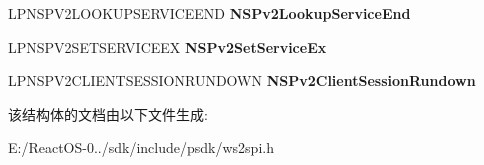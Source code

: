 \begin{DoxyCompactItemize}
\item 
\mbox{\label{struct___n_s_p_v2___r_o_u_t_i_n_e_a05573a2c24877e328718006a6db12b0e}} 
L\+P\+N\+S\+P\+V2\+L\+O\+O\+K\+U\+P\+S\+E\+R\+V\+I\+C\+E\+E\+ND {\bfseries N\+S\+Pv2\+Lookup\+Service\+End}
\item 
\mbox{\label{struct___n_s_p_v2___r_o_u_t_i_n_e_aa176c5df27d88ff22076eac5dbe4bcfe}} 
L\+P\+N\+S\+P\+V2\+S\+E\+T\+S\+E\+R\+V\+I\+C\+E\+EX {\bfseries N\+S\+Pv2\+Set\+Service\+Ex}
\item 
\mbox{\label{struct___n_s_p_v2___r_o_u_t_i_n_e_a7ca7f49b69b5c4cebdb669433ce7624d}} 
L\+P\+N\+S\+P\+V2\+C\+L\+I\+E\+N\+T\+S\+E\+S\+S\+I\+O\+N\+R\+U\+N\+D\+O\+WN {\bfseries N\+S\+Pv2\+Client\+Session\+Rundown}
\end{DoxyCompactItemize}


该结构体的文档由以下文件生成\+:\begin{DoxyCompactItemize}
\item 
E\+:/\+React\+O\+S-\/0../sdk/include/psdk/ws2spi.\+h\end{DoxyCompactItemize}
